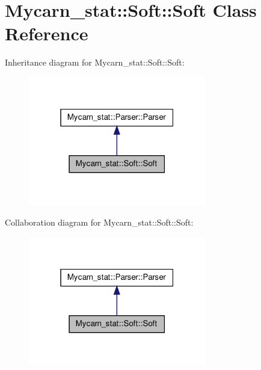 \hypertarget{classMycarn__stat_1_1Soft_1_1Soft}{
\section{\-Mycarn\-\_\-stat\-:\-:\-Soft\-:\-:\-Soft \-Class \-Reference}
\label{classMycarn__stat_1_1Soft_1_1Soft}
}


\-Inheritance diagram for \-Mycarn\-\_\-stat\-:\-:\-Soft\-:\-:\-Soft\-:
\nopagebreak
\begin{figure}[H]
\begin{center}
\leavevmode
\includegraphics[width=220pt]{classMycarn__stat_1_1Soft_1_1Soft__inherit__graph}
\end{center}
\end{figure}


\-Collaboration diagram for \-Mycarn\-\_\-stat\-:\-:\-Soft\-:\-:\-Soft\-:
\nopagebreak
\begin{figure}[H]
\begin{center}
\leavevmode
\includegraphics[width=220pt]{classMycarn__stat_1_1Soft_1_1Soft__coll__graph}
\end{center}
\end{figure}
